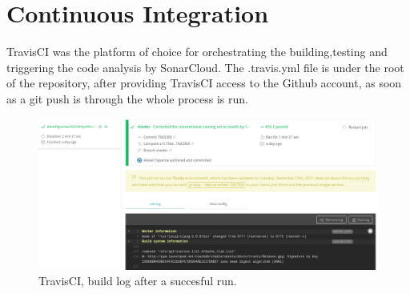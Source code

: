 \documentclass[margin,line,a4paper,authoryear,12pt]{report}
\begin{document}
\section{Continuous Integration}
TravisCI was the platform of choice for orchestrating the building,testing and triggering the code analysis by SonarCloud. The .travis.yml file is under the root of the repository,
after providing TravisCI access to the Github account, as soon as a git push is through the whole process is run.
\begin{figure}[h!]
    \centering
    \includegraphics[width=\linewidth]{travis_build_log.png}
    \caption{TravisCI, build log after a succesful run.}
    \label{fig:travisRun}
\end{figure}
\end{document}
